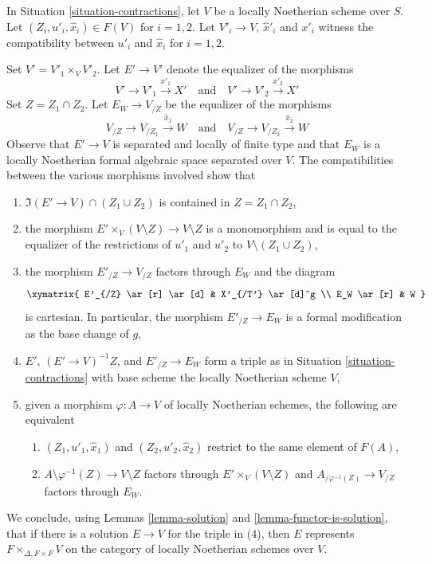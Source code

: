 \begin{remark}
\label{remark-diagonal}
In Situation \ref{situation-contractions}, let $V$ be a locally Noetherian scheme over $S$.
Let $(Z_i, u'_i, \hat x_i) \in F(V)$ for $i = 1, 2$. Let $V'_i \to V$,
$\hat x'_i$ and $x'_i$ witness the compatibility between $u'_i$ and
$\hat x_i$ for $i = 1, 2$.

\medskip\noindent
Set $V' = V'_1 \times_V V'_2$. Let $E' \to V'$ denote the equalizer
of the morphisms
$$
V' \to V'_1 \xrightarrow{x'_1} X'
\quad\text{and}\quad
V' \to V'_2 \xrightarrow{x'_2} X'
$$
Set $Z = Z_1 \cap Z_2$. Let $E_W \to V_{/Z}$
be the equalizer of the morphisms
$$
V_{/Z} \to V_{/Z_1} \xrightarrow{\hat x_1} W
\quad\text{and}\quad
V_{/Z} \to V_{/Z_2} \xrightarrow{\hat x_2} W
$$
Observe that $E' \to V$ is separated and locally of finite type
and that $E_W$ is a locally Noetherian formal algebraic space
separated over $V$.
The compatibilities between the various morphisms involved show that
\begin{enumerate}
\item $\Im(E' \to V) \cap (Z_1 \cup Z_2)$
is contained in $Z = Z_1 \cap Z_2$, 
\item the morphism $E' \times_V (V \setminus Z) \to V \setminus Z$
is a monomorphism and is equal to the equalizer of the restrictions
of $u'_1$ and $u'_2$ to $V \setminus (Z_1 \cup Z_2)$,
\item the morphism $E'_{/Z} \to V_{/Z}$ factors through $E_W$
and the diagram
$$
\xymatrix{
E'_{/Z} \ar[r] \ar[d] & X'_{/T'} \ar[d]^g \\
E_W \ar[r] & W
}
$$
is cartesian. In particular, the morphism $E'_{/Z} \to E_W$
is a formal modification as the base change of $g$,
\item $E'$, $(E' \to V)^{-1}Z$, and $E'_{/Z} \to E_W$
form a triple as in Situation \ref{situation-contractions}
with base scheme the locally Noetherian scheme $V$,
\item given a morphism $\varphi : A \to V$
of locally Noetherian schemes, the following are equivalent
\begin{enumerate}
\item $(Z_1, u'_1, \hat x_1)$ and $(Z_2, u'_2, \hat x_2)$
restrict to the same element of $F(A)$,
\item $A \setminus \varphi^{-1}(Z) \to V \setminus Z$
factors through $E' \times_V (V \setminus Z)$
and $A_{/\varphi^{-1}(Z)} \to V_{/Z}$
factors through $E_W$.
\end{enumerate}
\end{enumerate}
We conclude, using
Lemmas \ref{lemma-solution} and \ref{lemma-functor-is-solution},
that if there is a solution $E \to V$
for the triple in (4), then $E$ represents
$F \times_{\Delta, F \times F} V$ on the category of
locally Noetherian schemes over $V$.
\end{remark}

